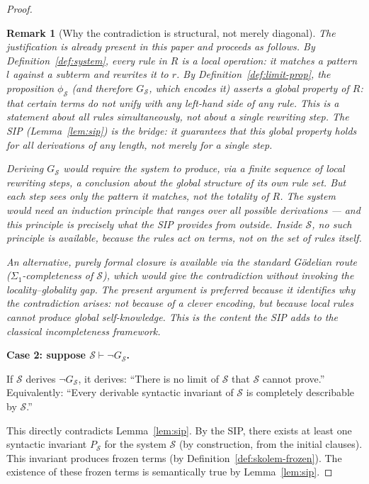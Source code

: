 \documentclass[11pt]{article}
\newtheorem{remark}[theorem]{Remark}
\begin{document}
\begin{proof}
\begin{remark}[Why the contradiction is structural, not merely diagonal]
The justification is already present in this paper and proceeds as
follows. By Definition~\ref{def:system}, every rule in $R$ is a local
operation: it matches a pattern $l$ against a subterm and rewrites it
to $r$. By Definition~\ref{def:limit-prop}, the proposition
$\phi_{\mathcal{S}}$ (and therefore $G_{\mathcal{S}}$, which encodes it)
asserts a \emph{global} property of $R$: that certain terms do not
unify with \emph{any} left-hand side of \emph{any} rule. This is a
statement about all rules simultaneously, not about a single rewriting
step. The SIP (Lemma~\ref{lem:sip}) is the bridge: it guarantees that
this global property holds for \emph{all} derivations of \emph{any}
length, not merely for a single step.

Deriving $G_{\mathcal{S}}$ would require the system to produce, via a
finite sequence of local rewriting steps, a conclusion about the global
structure of its own rule set. But each step sees only the pattern it
matches, not the totality of $R$. The system would need an induction
principle that ranges over all possible derivations --- and this
principle is precisely what the SIP provides \emph{from outside}. Inside
$\mathcal{S}$, no such principle is available, because the rules act on
terms, not on the set of rules itself.

An alternative, purely formal closure is available via the standard
G\"odelian route ($\Sigma_1$-completeness of $\mathcal{S}$), which
would give the contradiction without invoking the locality--globality
gap. The present argument is preferred because it identifies
\emph{why} the contradiction arises: not because of a clever encoding,
but because local rules cannot produce global self-knowledge.
This is the content the SIP adds to the classical incompleteness
framework.
\end{remark}

\medskip
\textbf{Case 2: suppose $\mathcal{S} \vdash \neg G_{\mathcal{S}}$.}

If $\mathcal{S}$ derives $\neg G_{\mathcal{S}}$, it derives: ``There is
no limit of $\mathcal{S}$ that $\mathcal{S}$ cannot prove.''
Equivalently: ``Every derivable syntactic invariant of $\mathcal{S}$ is
completely describable by $\mathcal{S}$.''

This directly contradicts Lemma~\ref{lem:sip}. By the SIP, there exists
at least one syntactic invariant $P_{\mathcal{S}}$ for the system
$\mathcal{S}$ (by construction, from the initial clauses). This
invariant produces frozen terms (by Definition~\ref{def:skolem-frozen}).
The existence of these frozen terms is semantically true by
Lemma~\ref{lem:sip}.


\end{proof}
\end{document}

